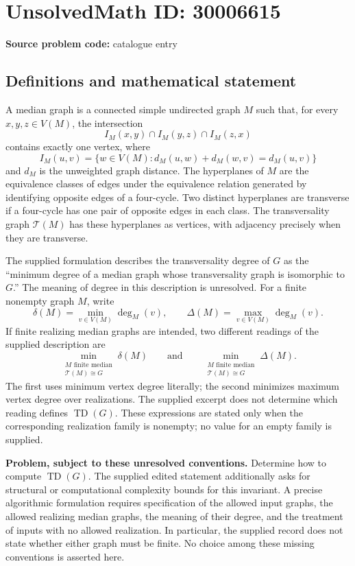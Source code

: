 \documentclass[11pt]{article}
\begin{document}
\section*{UnsolvedMath ID: 30006615}
\textbf{Source problem code:} catalogue entry
\subsection{Definitions and mathematical statement}
A median graph is a connected simple undirected graph \(M\) such that, for every \(x,y,z\in V(M)\), the intersection
\[
I_M(x,y)\cap I_M(y,z)\cap I_M(z,x)
\]
contains exactly one vertex, where
\[
I_M(u,v)=\{w\in V(M):d_M(u,w)+d_M(w,v)=d_M(u,v)\}
\]
and \(d_M\) is the unweighted graph distance. The hyperplanes of \(M\) are the equivalence classes of edges under the equivalence relation generated by identifying opposite edges of a four-cycle. Two distinct hyperplanes are transverse if a four-cycle has one pair of opposite edges in each class. The transversality graph \(\mathcal T(M)\) has these hyperplanes as vertices, with adjacency precisely when they are transverse.

The supplied formulation describes the transversality degree of \(G\) as the ``minimum degree of a median graph whose transversality graph is isomorphic to \(G\).'' The meaning of degree in this description is unresolved. For a finite nonempty graph \(M\), write
\[
\delta(M)=\min_{v\in V(M)}\deg_M(v),\qquad
\Delta(M)=\max_{v\in V(M)}\deg_M(v).
\]
If finite realizing median graphs are intended, two different readings of the supplied description are
\[
\min_{\substack{M\text{ finite median}\\\mathcal T(M)\cong G}}\delta(M)
\qquad\text{and}\qquad
\min_{\substack{M\text{ finite median}\\\mathcal T(M)\cong G}}\Delta(M).
\]
The first uses minimum vertex degree literally; the second minimizes maximum vertex degree over realizations. The supplied excerpt does not determine which reading defines \(\operatorname{TD}(G)\). These expressions are stated only when the corresponding realization family is nonempty; no value for an empty family is supplied.

\textbf{Problem, subject to these unresolved conventions.} Determine how to compute \(\operatorname{TD}(G)\). The supplied edited statement additionally asks for structural or computational complexity bounds for this invariant. A precise algorithmic formulation requires specification of the allowed input graphs, the allowed realizing median graphs, the meaning of their degree, and the treatment of inputs with no allowed realization. In particular, the supplied record does not state whether either graph must be finite. No choice among these missing conventions is asserted here.
\end{document}

